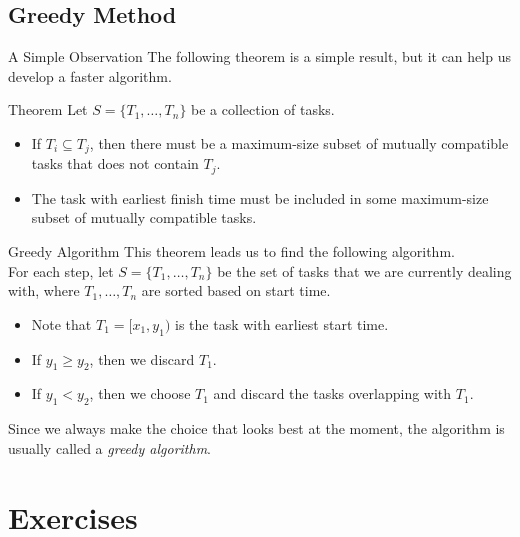 \documentclass{beamer}
\begin{document}
\subsection{Greedy Method}
\begin{frame}{A Simple Observation}
  The following theorem is a simple result, but it can help us develop a faster
  algorithm. \pause
  \begin{block}{Theorem}
    Let $S = \{T_1, \dots, T_n\}$ be a collection of tasks. \pause
    \begin{itemize}
      \item If $T_i \subseteq T_j$, then there must be a maximum-size subset of
      mutually compatible tasks that does not contain $T_j$. \pause
      \item The task with earliest finish time must be included in some
      maximum-size subset of mutually compatible tasks.
    \end{itemize}
  \end{block}
\end{frame}

\begin{frame}{Greedy Algorithm}
  This theorem leads us to find the following algorithm. \pause \\[1em]
  For each step, let $S = \{T_1, \dots, T_n\}$ be the set of tasks that we are
  currently dealing with, where $T_1, \dots, T_n$ are sorted based on start
  time. \pause
  \begin{itemize}
    \item Note that $T_1 = [x_1, y_1)$ is the task with earliest start time.
    \pause
    \item If $y_1 \geq y_2$, then we discard $T_1$. \pause
    \item If $y_1 < y_2$, then we choose $T_1$ and discard the tasks
    overlapping with $T_1$. \pause
  \end{itemize}
  Since we always make the choice that looks best at the moment, the algorithm
  is usually called a \emph{greedy algorithm}.
\end{frame}

\section{Exercises}
\end{document}

